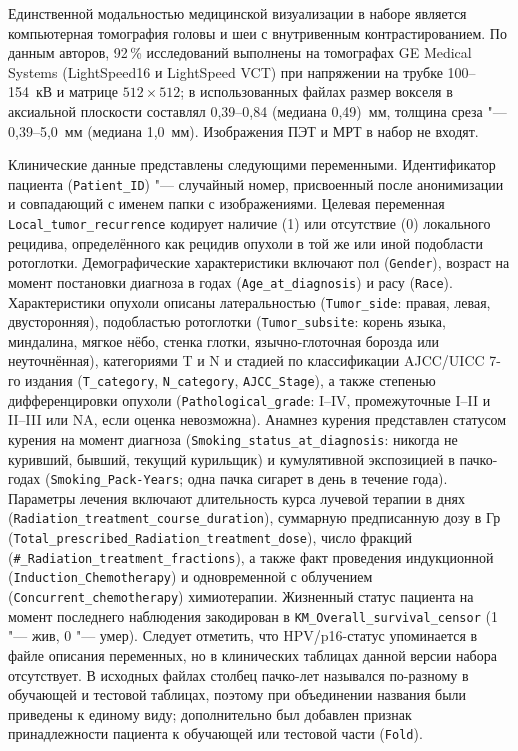 \documentclass[11pt,a4paper]{article}
\begin{document}
Единственной модальностью медицинской визуализации в наборе является компьютерная томография головы и шеи с внутривенным контрастированием. По данным авторов, 92\,\% исследований выполнены на томографах GE Medical Systems (LightSpeed16 и LightSpeed VCT) при напряжении на трубке 100--154~кВ и матрице $512\times512$; в использованных файлах размер вокселя в аксиальной плоскости составлял 0,39--0,84 (медиана 0,49)~мм, толщина среза "--- 0,39--5,0~мм (медиана 1,0~мм). Изображения ПЭТ и МРТ в набор не входят.

Клинические данные представлены следующими переменными. Идентификатор пациента (\texttt{Patient\_ID}) "--- случайный номер, присвоенный после анонимизации и совпадающий с именем папки с изображениями. Целевая переменная \texttt{Local\_tumor\_recurrence} кодирует наличие (1) или отсутствие (0) локального рецидива, определённого как рецидив опухоли в той же или иной подобласти ротоглотки. Демографические характеристики включают пол (\texttt{Gender}), возраст на момент постановки диагноза в годах (\texttt{Age\_at\_diagnosis}) и расу (\texttt{Race}). Характеристики опухоли описаны латеральностью (\texttt{Tumor\_side}: правая, левая, двусторонняя), подобластью ротоглотки (\texttt{Tumor\_subsite}: корень языка, миндалина, мягкое нёбо, стенка глотки, язычно-глоточная борозда или неуточнённая), категориями T и N и стадией по классификации AJCC/UICC 7-го издания (\texttt{T\_category}, \texttt{N\_category}, \texttt{AJCC\_Stage}), а также степенью дифференцировки опухоли (\texttt{Pathological\_grade}: I--IV, промежуточные I--II и II--III или NA, если оценка невозможна). Анамнез курения представлен статусом курения на момент диагноза (\texttt{Smoking\_status\_at\_diagnosis}: никогда не куривший, бывший, текущий курильщик) и кумулятивной экспозицией в пачко-годах (\texttt{Smoking\_Pack-Years}; одна пачка сигарет в день в течение года). Параметры лечения включают длительность курса лучевой терапии в днях (\texttt{Radiation\_treatment\_course\_duration}), суммарную предписанную дозу в Гр (\texttt{Total\_prescribed\_Radiation\_treatment\_dose}), число фракций (\texttt{\#\_Radiation\_treatment\_fractions}), а также факт проведения индукционной (\texttt{Induction\_Chemotherapy}) и одновременной с облучением (\texttt{Concurrent\_chemotherapy}) химиотерапии. Жизненный статус пациента на момент последнего наблюдения закодирован в \texttt{KM\_Overall\_survival\_censor} (1 "--- жив, 0 "--- умер). Следует отметить, что HPV/p16-статус упоминается в файле описания переменных, но в клинических таблицах данной версии набора отсутствует. В исходных файлах столбец пачко-лет назывался по-разному в обучающей и тестовой таблицах, поэтому при объединении названия были приведены к единому виду; дополнительно был добавлен признак принадлежности пациента к обучающей или тестовой части (\texttt{Fold}).
\end{document}
